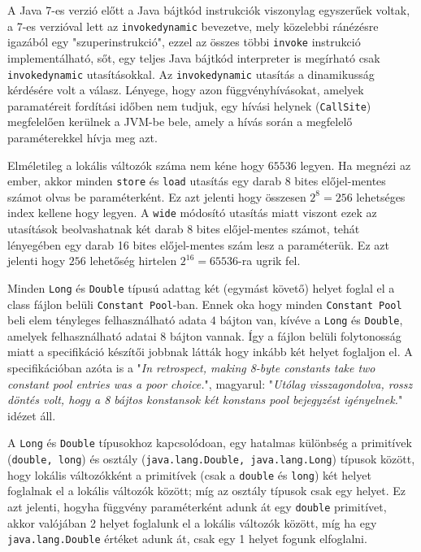 \begin{compactitem}
 \item A Java 7-es verzió előtt a Java bájtkód instrukciók viszonylag egyszerűek voltak, a 7-es verzióval lett az \lstinline{invokedynamic} bevezetve, mely közelebbi ránézésre igazából egy "szuperinstrukció", ezzel az összes többi \lstinline{invoke} instrukció implementálható, sőt, egy teljes Java bájtkód interpreter is megírható csak \lstinline{invokedynamic} utasításokkal. Az \lstinline{invokedynamic} utasítás a dinamikusság kérdésére volt a válasz. Lényege, hogy azon függvényhívásokat, amelyek paramatéreit fordítási időben nem tudjuk, egy hívási helynek (\lstinline{CallSite}) megfelelően kerülnek a JVM-be bele, amely a hívás során a megfelelő paraméterekkel hívja meg azt.
 \item Elméletileg a lokális változók száma nem kéne hogy $65536$ legyen. Ha megnézi az ember, akkor minden \lstinline{store} és \lstinline{load} utasítás egy darab 8 bites előjel-mentes számot olvas be paraméterként. Ez azt jelenti hogy összesen $2^{8} = 256$ lehetséges index kellene hogy legyen. A \lstinline{wide} módosító utasítás miatt viszont ezek az utasítások beolvashatnak két darab 8 bites előjel-mentes számot, tehát lényegében egy darab 16 bites előjel-mentes szám lesz a paraméterük. Ez azt jelenti hogy $256$ lehetőség hirtelen $2^{16} = 65536$-ra ugrik fel.
 \item Minden \lstinline{Long} és \lstinline{Double} típusú adattag két (egymást követő) helyet foglal el a class fájlon belüli \lstinline{Constant Pool}-ban. Ennek oka hogy minden \lstinline{Constant Pool} beli elem tényleges felhasználható adata $4$ bájton van, kívéve a \lstinline{Long} és \lstinline{Double}, amelyek felhasználható adatai $8$ bájton vannak. Így a fájlon belüli folytonosság miatt a specifikáció készítői jobbnak látták hogy inkább két helyet foglaljon el. A specifikációban azóta is a "\textit{In retrospect, making 8-byte constants take two constant pool entries was a poor choice.}", magyarul: "\textit{Utólag visszagondolva, rossz döntés volt, hogy a 8 bájtos konstansok két konstans pool bejegyzést igényelnek.}" idézet áll.
 \item A \lstinline{Long} és \lstinline{Double} típusokhoz kapcsolódoan, egy hatalmas különbség a primitívek (\lstinline{double, long}) és osztály (\lstinline{java.lang.Double, java.lang.Long}) típusok között, hogy lokális változókként a primitívek (csak a \lstinline{double} és \lstinline{long}) két helyet foglalnak el a lokális változók között; míg az osztály típusok csak egy helyet. Ez azt jelenti, hogyha függvény paraméterként adunk át egy \lstinline{double} primitívet, akkor valójában 2 helyet foglalunk el a lokális változók között, míg ha egy \lstinline{java.lang.Double} értéket adunk át, csak egy 1 helyet fogunk elfoglalni.

\end{compactitem}
